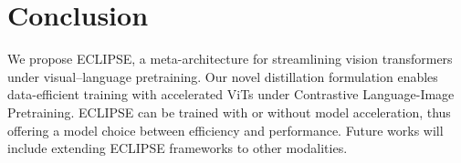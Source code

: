 \section{Conclusion}
\label{sec:conclusion}
We propose ECLIPSE, a meta-architecture for streamlining vision transformers under visual--language pretraining.
Our novel distillation formulation enables data-efficient training with accelerated ViTs under Contrastive Language-Image Pretraining.
ECLIPSE can be trained with or without model acceleration, thus offering a model choice between efficiency and performance.
Future works will include extending ECLIPSE frameworks to other modalities.